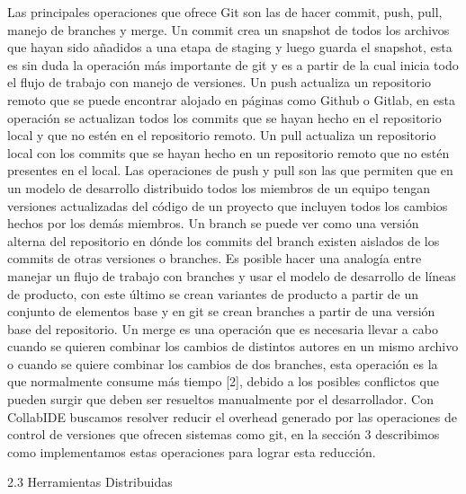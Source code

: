 Las principales operaciones que ofrece Git son las de hacer commit, push, pull, manejo de branches y merge. Un commit crea un snapshot de todos los archivos que hayan sido añadidos a una etapa de staging   
y luego guarda el snapshot, esta es sin duda la operación más importante de git y es a partir de la cual inicia todo el flujo de trabajo con manejo de versiones. Un push actualiza un repositorio remoto que se puede encontrar alojado en páginas como Github o Gitlab, en esta operación se actualizan todos los commits que se hayan hecho en el repositorio local y que no estén en el repositorio remoto. Un pull actualiza un repositorio local con los commits que se hayan hecho en un repositorio remoto que no estén presentes en el local. Las operaciones de push y pull son las que permiten que en un modelo de desarrollo distribuido todos los miembros de un equipo tengan versiones actualizadas del código de un proyecto que incluyen todos los cambios hechos por los demás miembros. Un branch se puede ver como una versión alterna del repositorio en dónde los commits del branch existen aislados de los commits de otras versiones o branches. Es posible hacer una analogía entre manejar un flujo de trabajo con branches y usar el modelo de desarrollo de líneas de producto, con este último se crean variantes de producto a partir de un conjunto de elementos base y en git se crean branches a partir de una versión base del repositorio. Un merge es una operación que es necesaria llevar a cabo cuando se quieren combinar los cambios de distintos autores en un mismo archivo o cuando se quiere combinar los cambios de dos branches, esta operación es la que normalmente consume más tiempo [2], debido a los posibles conflictos que pueden surgir que deben ser resueltos manualmente por el desarrollador. Con CollabIDE buscamos resolver reducir el overhead generado por las operaciones de control de versiones que ofrecen sistemas como git, en la sección 3 describimos como implementamos estas operaciones para lograr esta reducción. 

2.3 Herramientas Distribuidas 


